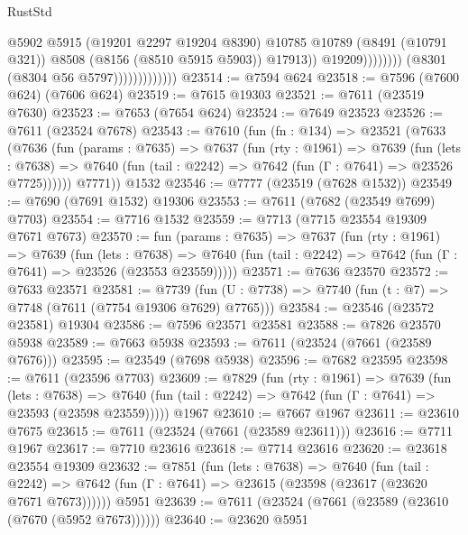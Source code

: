 \begin{lexlean}{RustStd}
\begin{coremodule}
{\begin{coremodule}
{{{{{{{{{{{{{{{{{{{{{{{{{{{{{{{{{{                                              @5902
                                              @5915
                                              (@19201 @2297 @19204 @8390)
                                              @10785
                                              @10789
                                              (@8491 (@10791 @321))
                                              @8508
                                              (@8156 (@8510 @5915 @5903))
                                              @17913))
                                          @19209))))))))
                          (@8301 (@8304 @56 @5797)))))))))))))
@23514 := @7594 @624
@23518 := @7596 (@7600 @624) (@7606 @624)
@23519 := @7615 @19303
@23521 := @7611 (@23519 @7630)
@23523 := @7653 (@7654 @624)
@23524 := @7649 @23523
@23526 := @7611 (@23524 @7678)
@23543 := @7610
    (fun (fn : @134) =>
    @23521
      (@7633
        (@7636
          (fun (params : @7635) =>
          @7637
            (fun (rty : @1961) =>
            @7639
              (fun (lets : @7638) =>
              @7640 (fun (tail : @2242) => @7642 (fun (Γ : @7641) => @23526 @7725))))))
        @7771))
    @1532
@23546 := @7777 (@23519 (@7628 @1532))
@23549 := @7690 (@7691 @1532) @19306
@23553 := @7611 (@7682 (@23549 @7699) @7703)
@23554 := @7716 @1532
@23559 := @7713 (@7715 @23554 @19309 @7671 @7673)
@23570 := fun (params : @7635) =>
  @7637
    (fun (rty : @1961) =>
    @7639
      (fun (lets : @7638) =>
      @7640 (fun (tail : @2242) => @7642 (fun (Γ : @7641) => @23526 (@23553 @23559)))))
@23571 := @7636 @23570
@23572 := @7633 @23571
@23581 := @7739
    (fun (U : @7738) => @7740 (fun (t : @7) => @7748 (@7611 (@7754 @19306 @7629) @7765)))
@23584 := @23546 (@23572 @23581) @19304
@23586 := @7596 @23571 @23581
@23588 := @7826 @23570 @5938
@23589 := @7663 @5938
@23593 := @7611 (@23524 (@7661 (@23589 @7676)))
@23595 := @23549 (@7698 @5938)
@23596 := @7682 @23595
@23598 := @7611 (@23596 @7703)
@23609 := @7829
    (fun (rty : @1961) =>
    @7639
      (fun (lets : @7638) =>
      @7640 (fun (tail : @2242) => @7642 (fun (Γ : @7641) => @23593 (@23598 @23559)))))
    @1967
@23610 := @7667 @1967
@23611 := @23610 @7675
@23615 := @7611 (@23524 (@7661 (@23589 @23611)))
@23616 := @7711 @1967
@23617 := @7710 @23616
@23618 := @7714 @23616
@23620 := @23618 @23554 @19309
@23632 := @7851
    (fun (lets : @7638) =>
    @7640
      (fun (tail : @2242) =>
      @7642 (fun (Γ : @7641) => @23615 (@23598 (@23617 (@23620 @7671 @7673))))))
    @5951
@23639 := @7611 (@23524 (@7661 (@23589 (@23610 (@7670 (@5952 @7673))))))
@23640 := @23620 @5951
}}}}}}}}}}}}}}}}}}}}}}}}}}}}}}}}}}
\end{coremodule}}
\end{coremodule}
\end{lexlean}
